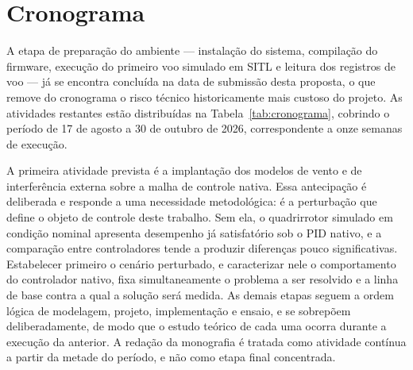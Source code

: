 \documentclass[12pt,a4paper]{article}
\begin{document}
\section{Cronograma}

A etapa de preparação do ambiente --- instalação do sistema, compilação do firmware,
execução do primeiro voo simulado em SITL e leitura dos registros de voo --- já se
encontra concluída na data de submissão desta proposta, o que remove do cronograma o
risco técnico historicamente mais custoso do projeto. As atividades restantes estão
distribuídas na Tabela~\ref{tab:cronograma}, cobrindo o período de 17 de agosto a 30
de outubro de 2026, correspondente a onze semanas de execução.

A primeira atividade prevista é a implantação dos modelos de vento e de interferência
externa sobre a malha de controle nativa. Essa antecipação é deliberada e responde a
uma necessidade metodológica: é a perturbação que define o objeto de controle deste
trabalho. Sem ela, o quadrirrotor simulado em condição nominal apresenta desempenho
já satisfatório sob o PID nativo, e a comparação entre controladores tende a produzir
diferenças pouco significativas. Estabelecer primeiro o cenário perturbado, e
caracterizar nele o comportamento do controlador nativo, fixa simultaneamente o
problema a ser resolvido e a linha de base contra a qual a solução será medida. As
demais etapas seguem a ordem lógica de modelagem, projeto, implementação e ensaio, e
se sobrepõem deliberadamente, de modo que o estudo teórico de cada uma ocorra durante
a execução da anterior. A redação da monografia é tratada como atividade contínua a
partir da metade do período, e não como etapa final concentrada.
\end{document}
